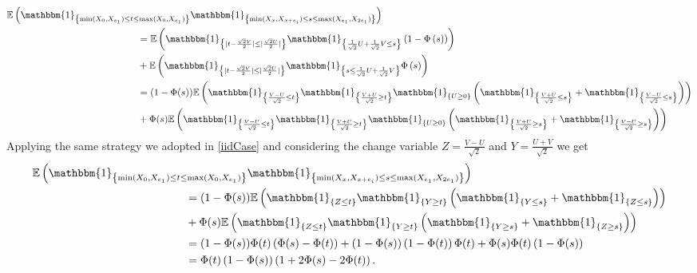 \documentclass[12pt]{article}
\theoremstyle{Theorem}
\begin{document}
{\small
\begin{align*}
\mathbb{E}\left(\mathbbm{1}_{\left\{\min(X_{\scriptscriptstyle 0}, X_{e_1}) \leq t \leq \max(X_{\scriptscriptstyle 0}, X_{e_1})\right\}}\mathbbm{1}_{\left\{\min(X_{\scriptscriptstyle x}, X_{x+e_i}) \leq s \leq \max(X_{e_1}, X_{2e_1}) \right\}}\right) & \\
& \hspace{-9cm} = \mathbb{E}\left(\mathbbm{1}_{\left\{ |t - \frac{\sqrt{2}V}{2}| \leq |\frac{\sqrt{2}U}{2}|\right\}}\mathbbm{1}_{\left\{\frac{1}{\sqrt{2}} U + \frac{1}{\sqrt{2}}V \leq s\right\}} \left(1 - \Phi\left(s\right)\right)\right) \\
& \hspace{-9cm} + \mathbb{E}\left(\mathbbm{1}_{\left\{ |t - \frac{\sqrt{2}V}{2}| \leq |\frac{\sqrt{2}U}{2}|\right\}}\mathbbm{1}_{\left\{ s \leq \frac{1}{\sqrt{2}}U + \frac{1}{\sqrt{2}}V \right\}}\Phi\left(s\right)\right) \\
& \hspace{-9cm} = (1-\Phi(s))\mathbb{E}\left(\mathbbm{1}_{\left\{\frac{V-U}{\sqrt{2}} \leq t \right\}}\mathbbm{1}_{\left\{\frac{V+U}{\sqrt{2}} \geq t \right\}}\mathbbm{1}_{\left\{U \geq 0\right\}}\left(\mathbbm{1}_{\left\{\frac{V+U}{\sqrt{2}} \leq s \right\}} + \mathbbm{1}_{\left\{\frac{V-U}{\sqrt{2}} \leq s \right\}}\right) \right)\\
& \hspace{-9cm} + \Phi(s)\mathbb{E}\left(\mathbbm{1}_{\left\{\frac{V-U}{\sqrt{2}} \leq t \right\}}\mathbbm{1}_{\left\{\frac{V+U}{\sqrt{2}} \geq t \right\}}\mathbbm{1}_{\left\{U \geq 0\right\}}\left(\mathbbm{1}_{\left\{\frac{V+U}{\sqrt{2}} \geq s \right\}} + \mathbbm{1}_{\left\{\frac{V-U}{\sqrt{2}} \geq s \right\}}\right) \right)
\end{align*}}
Applying the same strategy we adopted in \ref{iidCase} and considering the change variable $Z = \frac{V-U}{\sqrt{2}}$ and $Y = \frac{U+V}{\sqrt{2}}$ we get 
{\small
\begin{align*}
\mathbb{E}\left(\mathbbm{1}_{\left\{\min(X_{\scriptscriptstyle 0}, X_{e_1}) \leq t \leq \max(X_{\scriptscriptstyle 0}, X_{e_1})\right\}}\mathbbm{1}_{\left\{\min(X_{\scriptscriptstyle x}, X_{x+e_i}) \leq s \leq \max(X_{e_1}, X_{2e_1}) \right\}}\right) & \\
& \hspace{-9cm} = (1-\Phi(s))\mathbb{E}\left(\mathbbm{1}_{\left\{Z \leq t \right\}}\mathbbm{1}_{\left\{Y \geq t \right\}}\left(\mathbbm{1}_{\left\{Y \leq s \right\}} + \mathbbm{1}_{\left\{Z \leq s \right\}}\right) \right)\\
& \hspace{-9cm} + \Phi(s)\mathbb{E}\left(\mathbbm{1}_{\left\{Z \leq t \right\}}\mathbbm{1}_{\left\{Y \geq t \right\}}\left(\mathbbm{1}_{\left\{Y \geq s \right\}} + \mathbbm{1}_{\left\{Z \geq s \right\}}\right) \right) \\
& \hspace{-9cm}= (1-\Phi(s))\Phi(t)\left(\Phi(s) - \Phi(t)\right) + (1-\Phi(s))\left(1-\Phi(t)\right)\Phi(t)   + \Phi(s)\Phi(t)\left(1-\Phi(s)\right)\\
& \hspace{-9cm}= \Phi(t)\left(1-\Phi(s)\right)\left(1+ 2\Phi(s) - 2\Phi(t)\right).
\end{align*}}
\end{document}
